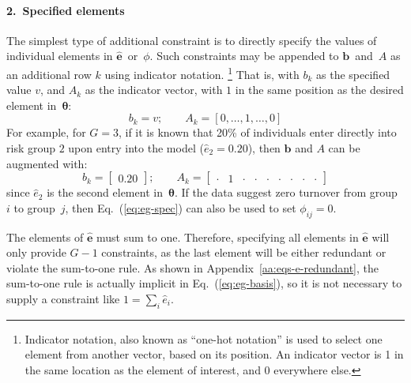 \paragraph{2.~Specified elements}
\label{con:spec-element}
The simplest type of additional constraint is to
directly specify the values of individual elements in $\bm{\hat{e}}$~or~$\phi$.
Such constraints may be appended to $\bm{b}$~and~$A$
as an additional row $k$ using indicator notation.%
\footnote{Indicator notation, also known as ``one-hot notation'' is used to
  select one element from another vector, based on its position.
  An indicator vector is 1 in the same location as the element of interest,
  and 0 everywhere else.}
That is, with $b_k$ as the specified value $v$,
and $A_k$ as the indicator vector,
with $1$ in the same position as the desired element in~$\bm{\theta}$:
\begin{equation}\label{eq:spec-elem}
b_k = v;\qquad
A_k = [0,\dots,1,\dots,0]
\end{equation}
For example, for $G = 3$, if it is known that 20\% of individuals
enter directly into risk group $2$ upon entry into the model ($\hat{e}_2 = 0.20$),
then $\bm{b}$ and $A$ can be augmented with:
\begin{equation}\label{eq:eg-spec}
b_k = \left[\begin{array}{c} 0.20 \end{array}\right];\qquad
A_k = \left[\begin{array}{ccccccccc}
  \cdot & 1 & \cdot & \cdot & \cdot & \cdot & \cdot & \cdot & \cdot
\end{array}\right] 
\end{equation}
since $\hat{e}_2$ is the second element in~$\bm{\theta}$.
If the data suggest zero turnover from group~$i$ to group~$j$,
then Eq.~(\ref{eq:eg-spec}) can also be used to set $\phi_{ij} = 0$.
\par
The elements of $\bm{\hat{e}}$ must sum to one.
Therefore, specifying all elements in $\bm{\hat{e}}$
will only provide $G-1$ constraints,
as the last element will be either redundant or violate the sum-to-one rule.
As shown in Appendix~\ref{aa:eqs-e-redundant},
the sum-to-one rule is actually implicit in Eq.~(\ref{eq:eg-basis}),
so it is not necessary to supply a constraint like $1 = \sum_{i} \hat{e}_i$.
